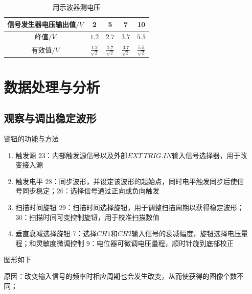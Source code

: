 \documentclass[UTF8]{ctexart}
\renewcommand{\normalsize}{\fontsize{12pt}{14.4pt}\selectfont}
\begin{document}
\begin{table}[H]
    \centering
    \caption{用示波器测电压}
    \begin{tabular}{|c|c|c|c|c|}
    \hline
        信号发生器电压输出值$/V$ & 2 & 5  & 7 & 10   \\
    \hline
        峰值$/V$ & $1.2$ & $2.7$ & $3.7$ & $5.5$ \\
    \hline
        有效值$/V$ & $\frac{1.2}{\sqrt{2}}$ & $\frac{2.7}{\sqrt{2}}$ & $\frac{3.7}{\sqrt{2}}$ & $\frac{5.5}{\sqrt{2}}$ \\
    \hline
    \end{tabular}
\end{table}

\section{数据处理与分析}
\subsection{观察与调出稳定波形}
键钮的功能与方法
\begin{enumerate}
    \item 触发源  \Large{\textcircled{\small{23}}}\normalsize ：内部触发源信号以及外部$EXT\  TRIG.IN$输入信号选择器，用于改变接入源
    \item 触发电平 \Large{\textcircled{\small{28}}}\normalsize：同步波形，并设定该波形的起始点，同时电平触发同步后使信号同步稳定；\Large{\textcircled{\small{26}}}\normalsize：选择信号通过正向或负向触发
    \item 扫描时间旋钮 \Large{\textcircled{\small{29}}}\normalsize：扫描时间选择旋钮，用于调整扫描周期以获得稳定波形；\Large{\textcircled{\small{30}}}\normalsize：扫描时间可变控制旋钮，用于校准扫描数值
    \item 垂直衰减选择旋钮 \large{\textcircled{\small{7}}}\normalsize：选择$CH1$和$CH2$输入信号的衰减幅度，旋钮选择电压量程；和灵敏度微调控制 
 \large{\textcircled{\small{9}}}\normalsize：电位器可微调电压量程，顺时针旋到底部校正
\end{enumerate}

图形如下
\vspace{13cm}


原因：改变输入信号的频率时相应周期也会发生改变，从而使获得的图像个数不同；





\newpage
\end{document}
